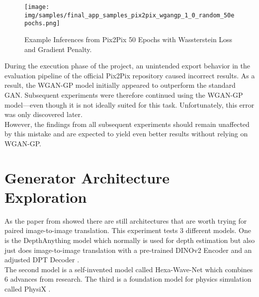 		\begin{figure}[H]
			\centering
			\texttt{[image: img/samples/final\_app\_samples\_pix2pix\_wgangp\_1\_0\_random\_50epochs.png]}
			\caption[Example Inferences from Pix2Pix 50 Epochs with Wassterstein Loss and Gradient Penalty.]{Example Inferences from Pix2Pix 50 Epochs with Wassterstein Loss and Gradient Penalty.}
			\label{fig:example_wgangp}
		\end{figure}
		\FloatBarrier
		
	\clearpage
	
	\begin{tcolorbox}[colback=yellow!10, colframe=red!80!black, title=Important Notice]
		During the execution phase of the project, an unintended export behavior in the evaluation pipeline of the official Pix2Pix repository caused incorrect results. As a result, the WGAN-GP model initially appeared to outperform the standard GAN. Subsequent experiments were therefore continued using the WGAN-GP model—even though it is not ideally suited for this task. Unfortunately, this error was only discovered later.\\ However, the findings from all subsequent experiments should remain unaffected by this mistake and are expected to yield even better results without relying on WGAN-GP.
	\end{tcolorbox}
	
	\clearpage
		
	\section{Generator Architecture Exploration}
	\label{sec:experiments-generator_architecture_exploration}
		As the paper from \citeauthor{achim_eckerle_evaluierung_2025} showed there are still architectures that are worth trying for paired image-to-image translation. This experiment tests 3 different models. One is the DepthAnything model \cite{yang2024depthv2} which normally is used for depth estimation but also just does image-to-image translation with a pre-trained DINOv2 Encoder \cite{oquab2024dinov2learningrobustvisual} and an adjusted DPT Decoder \cite{ranftl2021visiontransformersdenseprediction}.\\
		The second model is a self-invented model called Hexa-Wave-Net which combines 6 advances from research. The third is a foundation model for physics simulation called PhysiX \cite{nguyen2025physixfoundationmodelphysics}.
		
